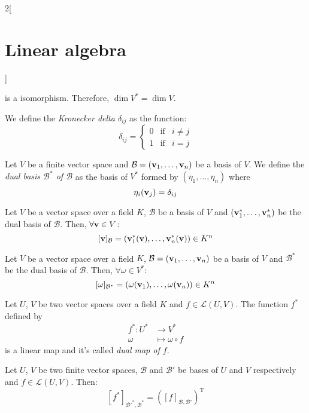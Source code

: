 \documentclass[../../../main.tex]{subfiles}
\begin{document}
\begin{multicols}{2}[\section{Linear algebra}]
\begin{prop}
    is a isomorphism. Therefore, $\dim V^*=\dim V$.
  \end{prop}
  \begin{definition}
    We define the \textit{Kronecker delta $\delta_{ij}$} as the function: $$\delta_{ij}=\left\{
      \begin{array}{ccc}
        0 & \text{if} & i\ne j \\
        1 & \text{if} & i=j
      \end{array}
      \right.$$
  \end{definition}
  \begin{definition}
    Let $V$ be a finite vector space and $\mathcal{B}=(\boldsymbol{\mathrm{v}}_1,\ldots,\boldsymbol{\mathrm{v}}_n)$ be a basis of $V$. We define the \textit{dual basis $\mathcal{B}^*$ of $\mathcal{B}$} as the basis of $V^*$ formed by $(\eta_1,\ldots,\eta_n)$ where $$\eta_i(\boldsymbol{\mathrm{v}}_j)=\delta_{ij}$$
  \end{definition}
  \begin{lemma}
    Let $V$ be a vector space over a field $K$, $\mathcal{B}$ be a basis of $V$ and $(\boldsymbol{\mathrm{v}}_1^*,\ldots,\boldsymbol{\mathrm{v}}_n^*)$ be the dual basis of $\mathcal{B}$. Then, $\forall \boldsymbol{\mathrm{v}}\in V$: $$[\boldsymbol{\mathrm{v}}]_\mathcal{B}=(\boldsymbol{\mathrm{v}}_1^*(\boldsymbol{\mathrm{v}}),\ldots,\boldsymbol{\mathrm{v}}_n^*(\boldsymbol{\mathrm{v}}))\in K^n$$
  \end{lemma}
  \begin{lemma}
    Let $V$ be a vector space over a field $K$, $\mathcal{B}=(\boldsymbol{\mathrm{v}}_1,\ldots,\boldsymbol{\mathrm{v}}_n)$ be a basis of $V$ and $\mathcal{B}^*$ be the dual basis of $\mathcal{B}$. Then, $\forall \omega\in V^*$: $$[\omega]_{\mathcal{B}^*}=(\omega(\boldsymbol{\mathrm{v}}_1),\ldots,\omega(\boldsymbol{\mathrm{v}}_n))\in K^n$$
  \end{lemma}
  \begin{definition}
    Let $U$, $V$ be two vector spaces over a field $K$ and $f\in \mathcal{L}(U,V)$. The function $f^*$ defined by
    \begin{align*}
      f^*:U^* & \longrightarrow V^*      \\
      \omega  & \longmapsto\omega\circ f
    \end{align*}
    is a linear map and it's called \textit{dual map of $f$}.
  \end{definition}
  \begin{theorem}
    Let $U$, $V$ be two finite vector spaces, $\mathcal{B}$ and $\mathcal{B}'$ be bases of $U$ and $V$ respectively and $f\in\mathcal{L}(U,V)$. Then: $$[f^*]_{\mathcal{B}'^*,\mathcal{B}^*}={([f]_{\mathcal{B},\mathcal{B}'})}^\mathrm{T}$$
  \end{theorem}

\end{multicols}
\end{document}
